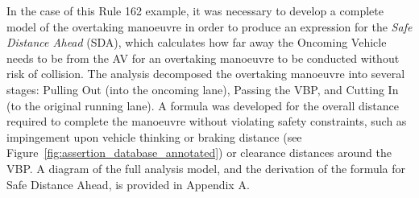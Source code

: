 
In the case of this Rule 162 example, it was necessary to develop a complete model of the overtaking manoeuvre in order to produce an expression for the \emph{Safe Distance Ahead} (SDA), which calculates how far away the Oncoming Vehicle needs to be from the AV for an overtaking manoeuvre to be conducted without risk of collision. The analysis decomposed the overtaking manoeuvre into several stages: Pulling Out (into the oncoming lane), Passing the VBP, and Cutting In (to the original running lane). A formula was developed for the overall distance required to complete the manoeuvre without violating safety constraints, such as impingement upon vehicle thinking or braking distance (see Figure~\ref{fig:assertion_database_annotated}) or clearance distances around the VBP. A diagram of the full analysis model, and the derivation of the formula for Safe Distance Ahead, is provided in Appendix A. 




